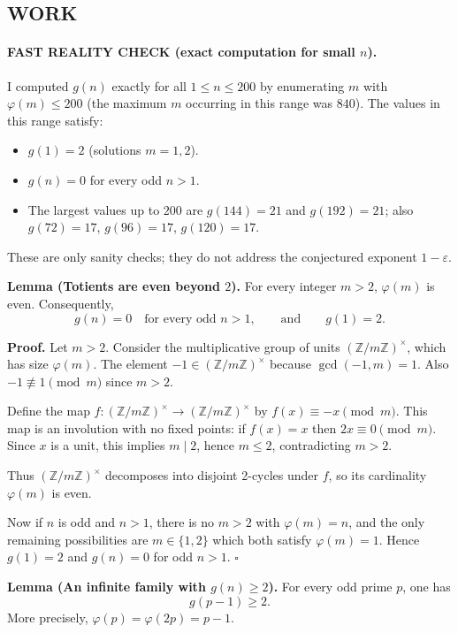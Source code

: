 \subsection*{WORK}
\paragraph{FAST REALITY CHECK (exact computation for small $n$).}
I computed $g(n)$ exactly for all $1\le n\le 200$ by enumerating $m$ with $\varphi(m)\le 200$ (the maximum $m$ occurring in this range was $840$). The values in this range satisfy:
\begin{itemize}
\item $g(1)=2$ (solutions $m=1,2$).
\item $g(n)=0$ for every odd $n>1$.
\item The largest values up to $200$ are $g(144)=21$ and $g(192)=21$; also $g(72)=17$, $g(96)=17$, $g(120)=17$.
\end{itemize}
These are only sanity checks; they do not address the conjectured exponent $1-\varepsilon$.

\noindent\textbf{Lemma (Totients are even beyond $2$).}
For every integer $m>2$, $\varphi(m)$ is even. Consequently,
\[
 g(n)=0\quad\text{for every odd }n>1,\qquad\text{and}\qquad g(1)=2.
\]

\noindent\textbf{Proof.}
Let $m>2$. Consider the multiplicative group of units $(\mathbb{Z}/m\mathbb{Z})^\times$, which has size $\varphi(m)$. The element $-1\in(\mathbb{Z}/m\mathbb{Z})^\times$ because $\gcd(-1,m)=1$. Also $-1\not\equiv 1\pmod m$ since $m>2$.

Define the map $f:(\mathbb{Z}/m\mathbb{Z})^\times\to(\mathbb{Z}/m\mathbb{Z})^\times$ by $f(x)\equiv -x\pmod m$. This map is an involution with no fixed points: if $f(x)=x$ then $2x\equiv 0\pmod m$. Since $x$ is a unit, this implies $m\mid 2$, hence $m\le 2$, contradicting $m>2$.

Thus $(\mathbb{Z}/m\mathbb{Z})^\times$ decomposes into disjoint 2-cycles under $f$, so its cardinality $\varphi(m)$ is even.

Now if $n$ is odd and $n>1$, there is no $m>2$ with $\varphi(m)=n$, and the only remaining possibilities are $m\in\{1,2\}$ which both satisfy $\varphi(m)=1$. Hence $g(1)=2$ and $g(n)=0$ for odd $n>1$.
\hfill$\square$


\noindent\textbf{Lemma (An infinite family with $g(n)\ge 2$).}
For every odd prime $p$, one has
\[
 g(p-1)\ge 2.
\]
More precisely, $\varphi(p)=\varphi(2p)=p-1$.

